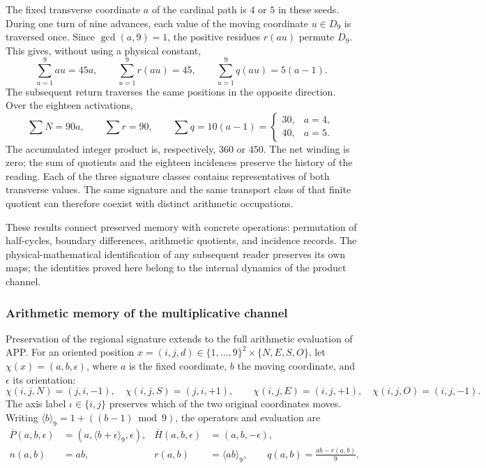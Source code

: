 The fixed transverse coordinate $a$ of the cardinal path is $4$ or
$5$ in these seeds. During one turn of nine advances, each
value of the moving coordinate $u\in D_9$ is traversed once. Since
$\gcd(a,9)=1$, the positive residues $r(au)$ permute $D_9$.
This gives, without using a physical constant,
\[
 \sum_{u=1}^9au=45a,\qquad
 \sum_{u=1}^9r(au)=45,\qquad
 \sum_{u=1}^9q(au)=5(a-1).
\]
The subsequent return traverses the same positions in the opposite direction.
Over the eighteen activations,
\begin{equation}
 \sum N=90a,\qquad\sum r=90,\qquad
 \sum q=10(a-1)=
 \begin{cases}30,&a=4,\\40,&a=5.\end{cases}
 \label{ii:bim09:ocupacion-30-40}
\end{equation}
The accumulated integer product is, respectively, $360$ or $450$.
The net winding is zero; the sum of quotients and the eighteen
incidences preserve the history of the reading. Each of the three
signature classes contains representatives of both transverse values.
The same signature and the same transport class of that finite quotient
can therefore coexist with distinct arithmetic occupations.

These results connect preserved memory with concrete
operations: permutation of half-cycles, boundary differences,
arithmetic quotients, and incidence records. The physical-mathematical
identification of any subsequent reader preserves its own
maps; the identities proved here belong to the internal dynamics
of the product channel.



\subsubsection{Arithmetic memory of the multiplicative channel}
\label{ii:prd-arit:seccion}

Preservation of the regional signature extends to the full
arithmetic evaluation of APP. For an oriented position
\(x=(i,j,d)\in\{1,\ldots,9\}^2\times\{N,E,S,O\}\), let
\(\chi(x)=(a,b,\epsilon)\), where \(a\) is the fixed coordinate,
\(b\) the moving coordinate, and \(\epsilon\) its orientation:
\[
 \chi(i,j,N)=(j,i,-1),\quad \chi(i,j,S)=(j,i,+1),\qquad
 \chi(i,j,E)=(i,j,+1),\quad \chi(i,j,O)=(i,j,-1).
\]
The axis label \(\iota\in\{i,j\}\) preserves which of the
two original coordinates moves. Writing
\(\langle b\rangle_9=1+((b-1)\bmod9)\), the operators and
evaluation are
\begin{align}
 \overline P(a,b,\epsilon)&=(a,\langle b+\epsilon\rangle_9,\epsilon),
 &\overline H(a,b,\epsilon)&=(a,b,-\epsilon),\label{ii:prd-arit:PH}\\
 n(a,b)&=ab,&r(a,b)&=\langle ab\rangle_9,\qquad
 q(a,b)=\frac{ab-r(a,b)}9.\label{ii:prd-arit:rq}
\end{align}

